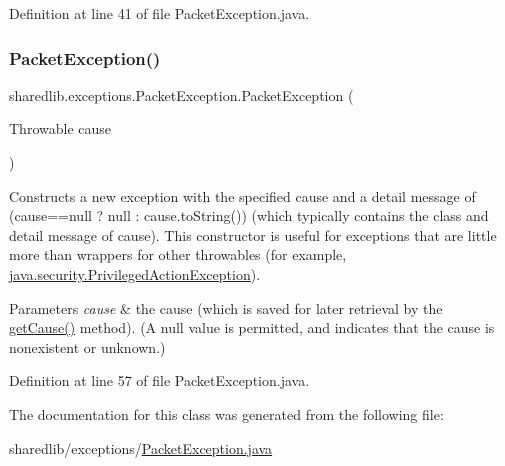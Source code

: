 Definition at line 41 of file Packet\+Exception.\+java.

\hypertarget{classsharedlib_1_1exceptions_1_1_packet_exception_a2b2f12eb7324a67bb7925408173f84ca}{}\label{classsharedlib_1_1exceptions_1_1_packet_exception_a2b2f12eb7324a67bb7925408173f84ca} 
\subsubsection{\texorpdfstring{Packet\+Exception()}{PacketException()}\hspace{0.1cm}{\footnotesize\ttfamily [4/4]}}
{\footnotesize\ttfamily sharedlib.\+exceptions.\+Packet\+Exception.\+Packet\+Exception (\begin{DoxyParamCaption}\item[{Throwable}]{cause }\end{DoxyParamCaption})}

Constructs a new exception with the specified cause and a detail message of {\ttfamily (cause==null ? null \+: cause.\+to\+String())} (which typically contains the class and detail message of {\ttfamily cause}). This constructor is useful for exceptions that are little more than wrappers for other throwables (for example, \hyperlink{}{java.\+security.\+Privileged\+Action\+Exception}).


\begin{DoxyParams}{Parameters}
{\em cause} & the cause (which is saved for later retrieval by the \hyperlink{}{get\+Cause()} method). (A {\ttfamily null} value is permitted, and indicates that the cause is nonexistent or unknown.) \\
\hline
\end{DoxyParams}


Definition at line 57 of file Packet\+Exception.\+java.



The documentation for this class was generated from the following file\+:\begin{DoxyCompactItemize}
\item 
sharedlib/exceptions/\hyperlink{_packet_exception_8java}{Packet\+Exception.\+java}\end{DoxyCompactItemize}
